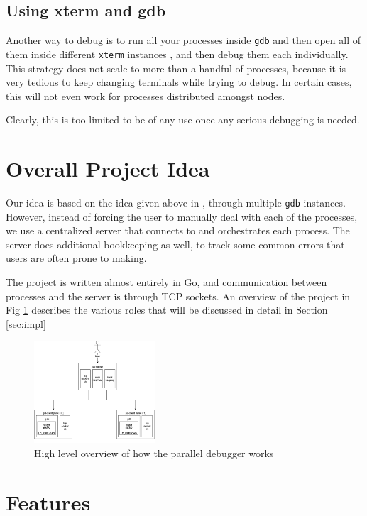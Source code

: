 \documentclass[10pt,conference]{IEEEtran}
\begin{document}
\subsection{Using xterm and gdb}

Another way to debug is to run all your processes inside \texttt{gdb} and then open all of them inside different \texttt{xterm} instances \cite{openmpidebug}, and then debug them each individually. This strategy does not scale to more than a handful of processes, because it is very tedious to keep changing terminals while trying to debug. In certain cases, this will not even work for processes distributed amongst nodes.

Clearly, this is too limited to be of any use once any serious debugging is needed.

\section{Overall Project Idea}

Our idea is based on the idea given above in \cite{openmpidebug}, through multiple \texttt{gdb} instances. However, instead of forcing the user to manually deal with each of the processes, we use a centralized server that connects to and orchestrates each process. The server does additional bookkeeping as well, to track some common errors that users are often prone to making.

The project is written almost entirely in Go, and communication between processes and the server is through TCP sockets. An overview of the project in Fig \ref{fig:overview} describes the various roles that will be discussed in detail in Section \ref{sec:impl}

\begin{figure}[h]
  \includegraphics[width=0.4\textwidth]{overview}
  \caption{High level overview of how the parallel debugger works}
  \label{fig:overview}
\end{figure}


\section{Features}
\end{document}
